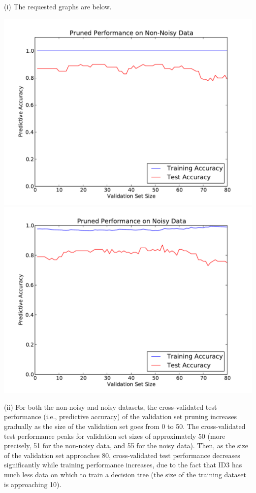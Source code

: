 \documentclass[solution, letterpaper]{cs121}
\begin{document}
(i) The requested graphs are below. 
\begin{center}
\includegraphics[scale=0.8]{prune-non-noisy.pdf}
\includegraphics[scale=0.8]{prune-noisy.pdf}
\end{center}

(ii) For both the non-noisy and noisy datasets, the cross-validated test performance (i.e., predictive accuracy) of the validation set pruning increases gradually as the size of the validation set goes from 0 to 50. The cross-validated test performance peaks for validation set sizes of approximately 50 (more precisely, 51 for the non-noisy data, and 55 for the noisy data). Then, as the size of the validation set approaches 80, cross-validated test performance decreases significantly while training performance increases, due to the fact that ID3 has much less data on which to train a decision tree (the size of the training dataset is approaching 10). \\
\end{document}
